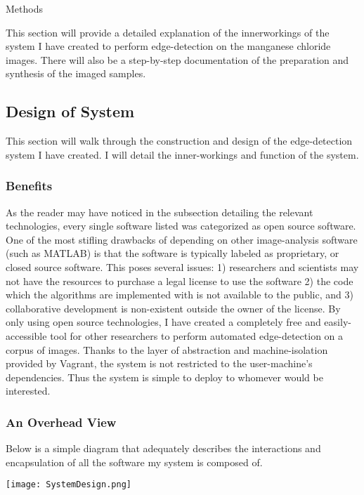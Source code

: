 \documentclass[a4paper,12pt]{article}
\begin{document}
\newpage
\begin{section}{Methods}

This section will provide a detailed explanation of the innerworkings of the system I have created to perform edge-detection on the manganese chloride images. There will also be a step-by-step documentation of the preparation and synthesis of the imaged samples.


\subsection{Design of System}

This section will walk through the construction and design of the edge-detection system I have created. I will detail the inner-workings and function of the system.

\subsubsection{Benefits}

As the reader may have noticed in the subsection detailing the relevant technologies, every single software listed was categorized as open source software. One of the most stifling drawbacks of depending on other image-analysis software (such as MATLAB) is that the software is typically labeled as proprietary, or closed source software. This poses several issues: 1) researchers and scientists may not have the resources to purchase a legal license to use the software 2) the code which the algorithms are implemented with is not available to the public, and 3) collaborative development is non-existent outside the owner of the license. By only using open source technologies, I have created a completely free and easily-accessible tool for other researchers to perform automated edge-detection on a corpus of images. Thanks to the layer of abstraction and machine-isolation provided by Vagrant, the system is not restricted to the user-machine's dependencies. Thus the system is simple to deploy to whomever would be interested. 

\subsubsection{An Overhead View}

Below is a simple diagram that adequately describes the interactions and encapsulation of all the software my system is composed of.

\begin{center}
\texttt{[image: SystemDesign.png]}
\end{center}


\end{section}
\end{document}
